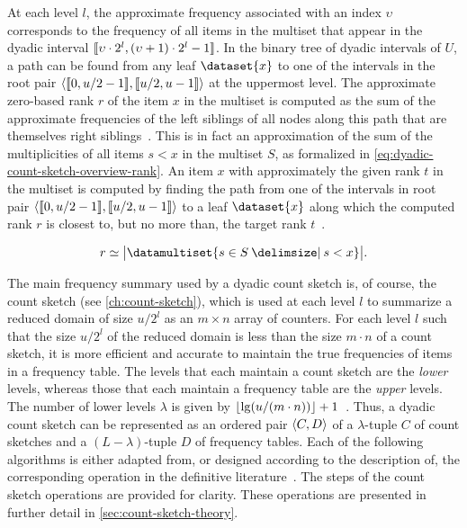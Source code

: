 At each level \( l \), the approximate frequency associated with an index \( \upsilon \) corresponds to the frequency of all items in the multiset that appear in the dyadic interval \( \llbracket\upsilon \cdot 2^{l}, (\upsilon + 1) \cdot 2^{l} - 1\rrbracket \).
In the binary tree of dyadic intervals of \( U \), a path can be found from any leaf \( \dataset{x} \) to one of the intervals in the root pair \( \langle\llbracket0, u / 2 - 1\rrbracket, \llbracket u / 2, u - 1\rrbracket\rangle \) at the uppermost level.
The approximate zero-based rank \( r \) of the item \( x \) in the multiset is computed as the sum of the approximate frequencies of the left siblings of all nodes along this path that are themselves right siblings~\citep{cormode20}.
This is in fact an approximation of the sum of the multiplicities of all items \( s < x \) in the multiset \( S \), as formalized in \cref{eq:dyadic-count-sketch-overview-rank}.
An item \( x \) with approximately the given rank \( t \) in the multiset is computed by finding the path from one of the intervals in root pair \( \langle\llbracket0, u / 2 - 1\rrbracket, \llbracket u / 2, u - 1\rrbracket\rangle \) to a leaf \( \dataset{x} \) along which the computed rank \( r \) is closest to, but no more than, the target rank \( t \)~\citep{cormode20}.

\begin{equation}
  \label{eq:dyadic-count-sketch-overview-rank}
  r \simeq \cardinality[\big]{\datamultiset{s \in S \suchthat s < x}}.
\end{equation}

The main frequency summary used by a dyadic count sketch is, of course, the count sketch (see \cref{ch:count-sketch}), which is used at each level \( l \) to summarize a reduced domain of size \( u / 2^{l} \) as an \( m \times n \) array of counters.
For each level \( l \) such that the size \( u / 2^{l} \) of the reduced domain is less than the size \( m \cdot n \) of a count sketch, it is more efficient and accurate to maintain the true frequencies of items in a frequency table.
The levels that each maintain a count sketch are the \emph{lower} levels, whereas those that each maintain a frequency table are the \emph{upper} levels.
The number of lower levels \( \lambda \) is given by \( \lfloor\lg (u / (m \cdot n))\rfloor + 1 \)~\citep{cormode20}.
Thus, a dyadic count sketch can be represented as an ordered pair \( \langle C, D\rangle \) of a \( \lambda \)-tuple \( C \) of count sketches and a \( (L - \lambda) \)-tuple \( D \) of frequency tables.
Each of the following algorithms is either adapted from, or designed according to the description of, the corresponding operation in the definitive literature~\citep{wang13}.
The steps of the count sketch operations are provided for clarity.
These operations are presented in further detail in \cref{sec:count-sketch-theory}.

